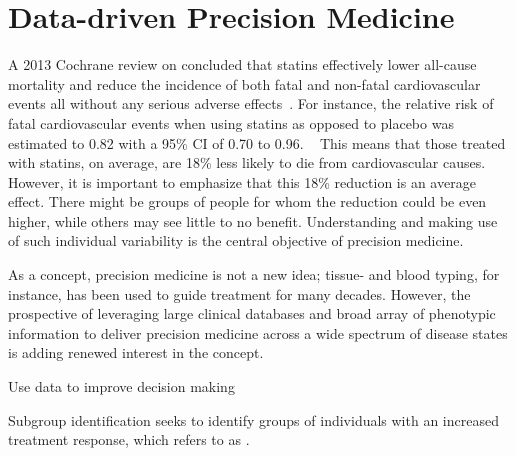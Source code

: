 \chapter{Data-driven Precision Medicine} \label{precision-medicine}

A 2013 Cochrane review on  concluded 
that statins effectively lower all-cause mortality and reduce the incidence
of both fatal and non-fatal cardiovascular events all without any serious
adverse effects~\autocite{taylorStatins2013}.
For instance, the relative risk of fatal cardiovascular events 
when using statins as opposed to placebo
was estimated to \num{0.82} with a 
\si{95}{\%} \ac{CI} of \num{0.70} to \num{0.96}.
~\autocite{taylorStatins2013}
This means that those treated with statins, on average,
are \si{18}{\%} less likely to die from cardiovascular causes. 
However, it is important to emphasize that this \si{18}{\%} 
reduction is an average effect.
There might be groups of people for whom the reduction could be 
even higher, while others may see little to no benefit. 
Understanding and making use of such individual variability 
is the central objective of precision medicine.

As a concept, precision medicine is not a new idea;
tissue- and blood typing, for instance,  
has been used to guide treatment for many decades.
However, the prospective of leveraging large clinical databases
and broad array of phenotypic information 
to deliver precision medicine across
a wide spectrum of disease states
is adding renewed interest in the concept.






Use data to improve decision making


Subgroup identification seeks to identify groups of individuals with an
increased treatment response, which
\citeauthor{kosorokPrecision2019} refers to as 
.



